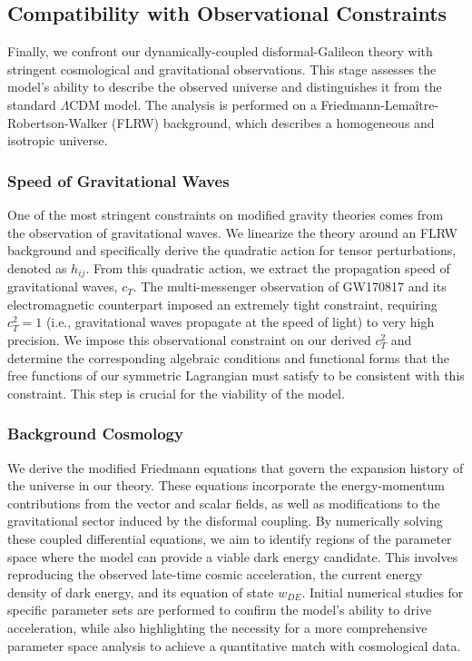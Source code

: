\documentclass[twocolumn]{aastex631}
\begin{document}
\subsection{Compatibility with Observational Constraints}

Finally, we confront our dynamically-coupled disformal-Galileon theory with stringent cosmological and gravitational observations. This stage assesses the model's ability to describe the observed universe and distinguishes it from the standard $\Lambda$CDM model. The analysis is performed on a Friedmann-Lemaître-Robertson-Walker (FLRW) background, which describes a homogeneous and isotropic universe.

\subsubsection{Speed of Gravitational Waves}
One of the most stringent constraints on modified gravity theories comes from the observation of gravitational waves. We linearize the theory around an FLRW background and specifically derive the quadratic action for tensor perturbations, denoted as $h_{ij}$. From this quadratic action, we extract the propagation speed of gravitational waves, $c_T$. The multi-messenger observation of GW170817 and its electromagnetic counterpart imposed an extremely tight constraint, requiring $c_T^2=1$ (i.e., gravitational waves propagate at the speed of light) to very high precision. We impose this observational constraint on our derived $c_T^2$ and determine the corresponding algebraic conditions and functional forms that the free functions of our symmetric Lagrangian must satisfy to be consistent with this constraint. This step is crucial for the viability of the model.

\subsubsection{Background Cosmology}
We derive the modified Friedmann equations that govern the expansion history of the universe in our theory. These equations incorporate the energy-momentum contributions from the vector and scalar fields, as well as modifications to the gravitational sector induced by the disformal coupling. By numerically solving these coupled differential equations, we aim to identify regions of the parameter space where the model can provide a viable dark energy candidate. This involves reproducing the observed late-time cosmic acceleration, the current energy density of dark energy, and its equation of state $w_{DE}$. Initial numerical studies for specific parameter sets are performed to confirm the model's ability to drive acceleration, while also highlighting the necessity for a more comprehensive parameter space analysis to achieve a quantitative match with cosmological data.
\end{document}
